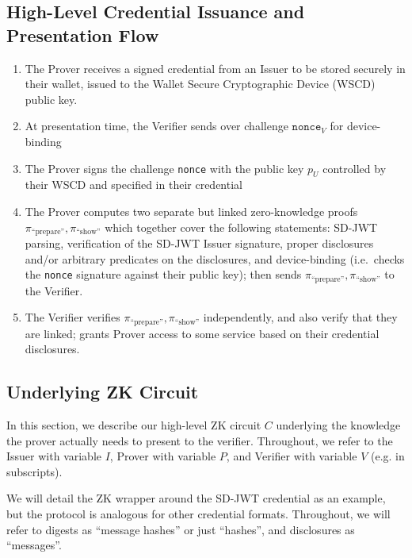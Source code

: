 \subsection{High-Level Credential Issuance and Presentation Flow}\label{sec:high-level-flow}

\begin{enumerate}
\item The Prover receives a signed credential from an Issuer to be stored securely in their wallet, issued to the Wallet Secure Cryptographic Device (WSCD) public key.
\item At presentation time, the Verifier sends over challenge $\texttt{nonce}_V$ for device-binding
\item The Prover signs the challenge \texttt{nonce} with the public key $p_U$ controlled by their WSCD and specified in their credential
\item The Prover computes two separate but linked zero-knowledge proofs $\pi_{\text{``prepare''}}, \pi_{\text{``show''}}$ which together cover the following statements: SD-JWT parsing, verification of the SD-JWT Issuer signature, 
proper disclosures and/or arbitrary predicates on the disclosures, and device-binding 
(i.e.\ checks the \texttt{nonce} signature against their public key); then sends $\pi_{\text{``prepare''}}, \pi_{\text{``show''}}$ to the Verifier.
\item The Verifier verifies $\pi_{\text{``prepare''}}, \pi_{\text{``show''}}$ independently, and also verify that they are linked; grants Prover access to some service based on their credential disclosures.
\end{enumerate}

\subsection{Underlying ZK Circuit}

In this section, we describe our high-level ZK circuit $C$ underlying the knowledge the prover actually needs to present to the verifier.
Throughout, we refer to the Issuer with variable $I$, Prover with variable $P$, and Verifier with variable $V$ (e.g. in subscripts). 

We will detail the ZK wrapper around the SD-JWT credential as an example, but the protocol is analogous for other credential formats. 
Throughout, we will refer to digests as ``message hashes'' or just ``hashes'', and disclosures as ``messages''.

